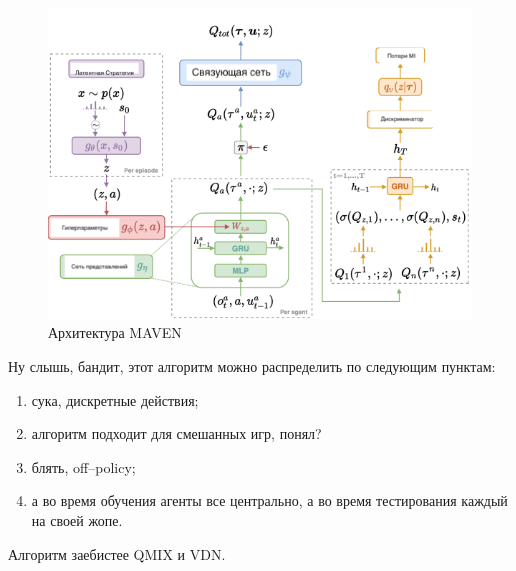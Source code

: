 \begin{figure}[H]
	\begin{center}
		\includegraphics[pages=-, width=140mm]{./inc/img/maven.png}
		\caption{Архитектура MAVEN}
		\label{fig:maven}
	\end{center}
\end{figure}

Ну слышь, бандит, этот алгоритм можно распределить по следующим пунктам:
\begin{enumerate}[label={\arabic*)}]
\item сука, дискретные действия;
\item алгоритм подходит для смешанных игр, понял?
\item блять, off--policy;
\item а во время обучения агенты все центрально, а во время тестирования каждый на своей жопе.
\end{enumerate}

Алгоритм заебистее QMIX и VDN.


